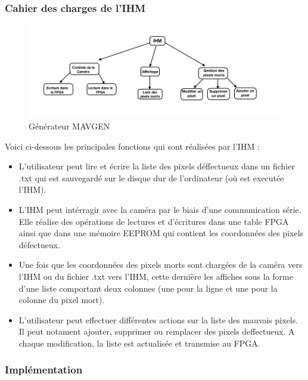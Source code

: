 \subsubsection{Cahier des charges de l'IHM } 

\begin{figure}[ht]
	\centering
    \includegraphics[scale=0.5]{img/cdcIHM.png}
    \caption{Générateur MAVGEN}
    \label{fig:mavgen}
\end{figure}

Voici ci-dessous les principales fonctions qui sont réalisées par l'IHM : 
\newline
\begin{itemize}
	\item L'utilisateur peut lire et écrire la liste des pixels déffectueux dans un fichier .txt qui est sauvegardé sur le disque dur de l'ordinateur (où est executée l'IHM). 
	\item L'IHM peut intérragir avec la caméra par le biais d'une communication série. Elle réalise des opérations de lectures et d'écritures dans une table FPGA ainsi que dans une mémoire EEPROM qui contient les coordonnées des pixels défectueux. 
	\item Une fois que les coordonnées des pixels morts sont chargées de la caméra vers l'IHM ou du fichier .txt vers l'IHM, cette dernière les affiches sous la forme d'une liste comportant deux colonnes (une pour la ligne et une pour la colonne du pixel mort). 
	\item L'utilisateur peut effectuer différentes actions sur la liste des mauvais pixels. Il peut notament ajouter, supprimer ou remplacer des pixels deffectueux. A chaque modification, la liste est actualisée et transmise au FPGA.

\end{itemize}

\subsubsection{Implémentation}

